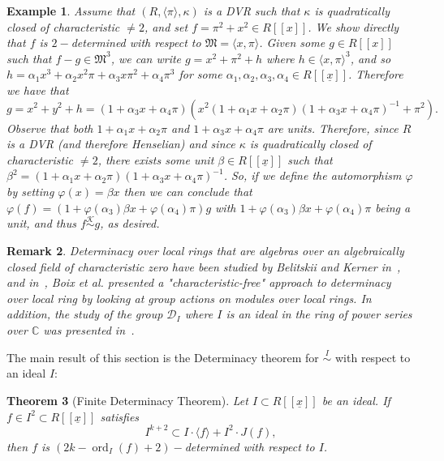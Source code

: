 \documentclass{article}
\newtheorem{theorem}{Theorem}
\newtheorem{example}[theorem]{Example}
\newtheorem{remark}[theorem]{Remark}
\DeclareMathOperator{\ord}{ord}
\newcommand{\equivk}{\overset{\mathcal{K}}{\sim}}
\newcommand{\equivd}{\overset{I}{\sim}}
\numberwithin{theorem}{section}
\begin{document}
\begin{example}\label{ex:A_1_det}
    \textup{Assume that $(R, \langle \pi\rangle, \kappa)$ is a DVR such that $\kappa$ is quadratically closed of characteristic $\neq 2$, and set $f=\pi^2 + x^2 \in R[[x]]$. We show directly that $f$ is $2-$determined with respect to $\mathfrak{M}=\langle x, \pi \rangle$. Given some $g\in R[[x]]$ such that $f - g \in \mathfrak{M}^3$, we can write $g = x^2+\pi^2 + h$ where $h \in \langle x,\pi \rangle^3$, and so $h=\alpha_1 x^3 + \alpha_2 x^2 \pi + \alpha_3 x\pi^2 + \alpha_4 \pi^3$ for some $\alpha_1, \alpha_2, \alpha_3, \alpha_4 \in R[[\underline{x}]]$. Therefore we have that}
    \begin{equation*}
        g = x^2+y^2 +h = (1+\alpha_3 x + \alpha_4\pi) (x^2(1+\alpha_1 x + \alpha_2\pi)(1+\alpha_3x + \alpha_4\pi)^{-1} + \pi^2).
    \end{equation*}
    \textup{Observe that both $1+\alpha_1 x + \alpha_2\pi$ and $1+\alpha_3x + \alpha_4\pi$ are units. Therefore, since $R$ is a DVR (and therefore Henselian) and since $\kappa$ is quadratically closed of characteristic $\neq 2$, there exists some unit $\beta \in R[[\underline{x}]]$ such that $\beta^2=(1+\alpha_1 x + \alpha_2\pi)(1+\alpha_3x + \alpha_4\pi)^{-1}$. So, if we define the automorphism $\varphi$ by setting $\varphi(x)=\beta x$ then we can conclude that $\varphi(f)=(1+\varphi(\alpha_3)\beta x + \varphi(\alpha_4)\pi) g$ with $1+\varphi(\alpha_3)\beta x+ \varphi(\alpha_4)\pi$ being a unit, and thus $f \equivk g$, as desired. }
\end{example}

\begin{remark}
    \textup{Determinacy over local rings that are algebras over an algebraically closed field of characteristic zero have been studied by Belitskii and Kerner in~\cite{belitskii2012matrices, belitskii2016finite, belitskii2019finite}, and in~\cite{boix2022pairs}, Boix et al. presented a "characteristic-free" approach to determinacy over local ring by looking at group actions on modules over local rings.  In addition, the study of the group $\mathcal{D}_I$ where $I$ is an ideal in the ring of power series over $\mathbb{C}$ was presented in~\cite{pellikaan1988finite}. }
\end{remark}

The main result of this section is the Determinacy theorem for $\equivd$ with respect to an ideal $I$:

\begin{theorem}[Finite Determinacy Theorem]\label{thm_App}
    Let $I \subset R[[\underline{x}]]$ be an ideal. If $f \in I^2 \subset R[[\underline{x}]]$ satisfies
    \begin{equation*}
        I^{k+2} \subset I \cdot \langle f \rangle + I^2 \cdot J(f),
    \end{equation*}
      then $f$ is $\left(2k-\ord_I\left(f\right)+2\right)-$determined with respect to $I$.
\end{theorem}
\end{document}
